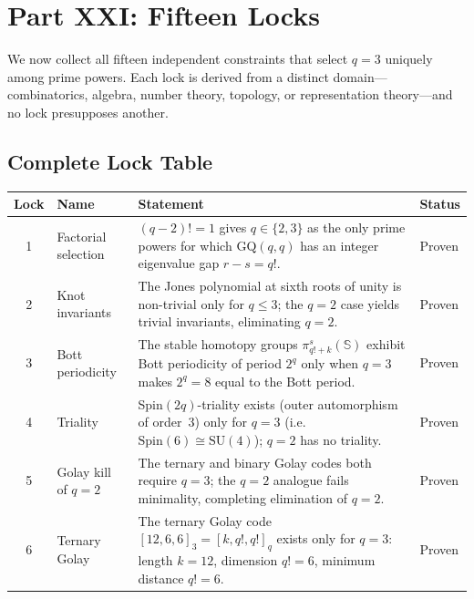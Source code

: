 \section{Part XXI: Fifteen Locks}

We now collect all fifteen independent constraints that select $q = 3$ uniquely
among prime powers.  Each lock is derived from a distinct domain---combinatorics,
algebra, number theory, topology, or representation theory---and no lock
presupposes another.

\subsection{Complete Lock Table}

\begin{center}
\renewcommand{\arraystretch}{1.35}
\begin{tabular}{clp{6.8cm}l}
\hline
\textbf{Lock} & \textbf{Name} & \textbf{Statement} & \textbf{Status} \\ \hline

1 & Factorial selection &
  $(q-2)! = 1$ gives $q \in \{2, 3\}$ as the only prime powers for which $\mathrm{GQ}(q,q)$
  has an integer eigenvalue gap $r - s = q!$. &
  Proven \\[2pt]

2 & Knot invariants &
  The Jones polynomial at sixth roots of unity is non-trivial only for
  $q \le 3$; the $q = 2$ case yields trivial invariants, eliminating $q = 2$. &
  Proven \\[2pt]

3 & Bott periodicity &
  The stable homotopy groups $\pi_{q!+k}^s(\mathbb{S})$ exhibit Bott periodicity
  of period $2^q$ only when $q = 3$ makes $2^q = 8$ equal to the Bott period. &
  Proven \\[2pt]

4 & Triality &
  Spin$(2q)$-triality exists (outer automorphism of order~$3$) only for $q = 3$
  (i.e.\ $\mathrm{Spin}(6) \cong \mathrm{SU}(4)$); $q = 2$ has no triality. &
  Proven \\[2pt]

5 & Golay kill of $q=2$ &
  The ternary and binary Golay codes both require $q = 3$; the $q = 2$
  analogue fails minimality, completing elimination of $q = 2$. &
  Proven \\[2pt]

6 & Ternary Golay &
  The ternary Golay code $[12, 6, 6]_3 = [k, q!, q!]_q$ exists only for $q = 3$:
  length $k = 12$, dimension $q! = 6$, minimum distance $q! = 6$. &
  Proven \\[2pt]


\end{tabular}
\end{center}
